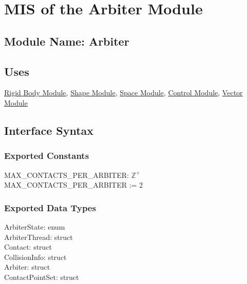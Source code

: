\documentclass[12pt]{article}
\newcommand{\UZ}{$\mathbb{Z}^+$}
\newcommand{\Body}{\hyperref[MISBody]{Rigid Body Module}}
\newcommand{\Shape}{\hyperref[MISShape]{Shape Module}}
\newcommand{\Space}{\hyperref[MISSpace]{Space Module}}
\newcommand{\Control}{\hyperref[MISControl]{Control Module}}
\newcommand{\Vector}{\hyperref[MISVector]{Vector Module}}
\begin{document}

\section{MIS of the Arbiter Module} \label{MISArbiter}

\subsection{Module Name: Arbiter}

\subsection{Uses} \label{SecUArbiter}
	\Body, \Shape, \Space, \Control, \Vector

\subsection{Interface Syntax}

\subsubsection{Exported Constants} \label{SecECArbiter}
	MAX_CONTACTS_PER_ARBITER: \UZ \\
	MAX_CONTACTS_PER_ARBITER := 2
	

\subsubsection{Exported Data Types} \label{SecEDTArbiter}
	ArbiterState: enum \\
	ArbiterThread: struct \\
	Contact: struct \\
	CollisionInfo: struct \\
	Arbiter: struct \\
	ContactPointSet: struct
	
\pagebreak %
\end{document}
